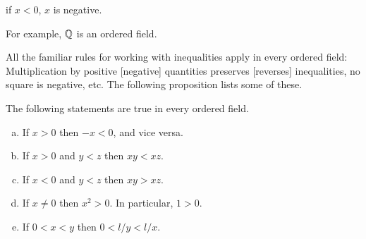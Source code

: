 if $x < 0$, $x$ is negative.

For example, ${\protect\mathbb Q} $ is an ordered field.

All the familiar rules for working with inequalities apply in every ordered
field: 
Multiplication by positive [negative] quantities preserves [reverses] inequalities, no square is negative, etc. 
The following proposition lists some of these.


\begin{myProposition}
    \label{myProposition:1.18}
    The following statements are true in every ordered field.
    \begin{enumerate}[(a)]
        \item If $x>0$ then $-x <0$, and vice versa.
        \item If $x>0$ and $y<z$ then $xy <xz$.
        \item If $x<0$ and $y<z$ then $xy> xz$.
        \item If $x \neq 0$ then $x^2 > 0$. In particular, $1 > 0$.
        \item If $0<x<y$ then $0<l/y<l/x$.
    \end{enumerate}
\end{myProposition}

